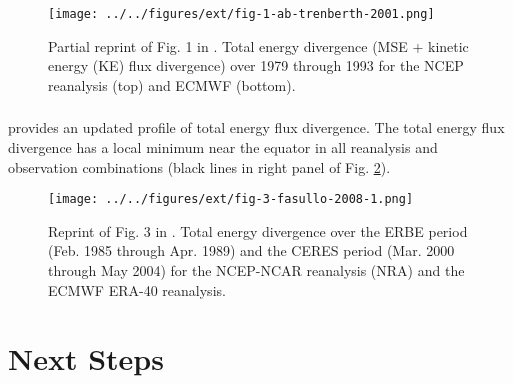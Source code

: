 \documentclass[11pt]{article}
\begin{document}
\begin{figure}[htbp]
\centering
\texttt{[image: ../../figures/ext/fig-1-ab-trenberth-2001.png]}
\caption{\label{fig:org11c0aa0}Partial reprint of Fig. 1 in \cite{trenberth_atmospheric_2001}. Total energy divergence (MSE + kinetic energy (KE) flux divergence) over 1979 through 1993 for the NCEP reanalysis (top) and ECMWF (bottom).}
\end{figure}

\subsubsection{\cite{fasullo_annual_2008-1}}
\label{sec:orge1b7cb9}
\cite{fasullo_annual_2008-1} provides an updated profile of total energy flux divergence. The total energy flux divergence has a local minimum near the equator in all reanalysis and observation combinations (black lines in right panel of Fig. \ref{fig:orgb8d6b32}).

\begin{figure}[htbp]
\centering
\texttt{[image: ../../figures/ext/fig-3-fasullo-2008-1.png]}
\caption{\label{fig:orgb8d6b32}Reprint of Fig. 3 in \cite{fasullo_annual_2008-1}. Total energy divergence over the ERBE period (Feb. 1985 through Apr. 1989) and the CERES period (Mar. 2000 through May 2004) for the NCEP-NCAR reanalysis (NRA) and the ECMWF ERA-40 reanalysis.}
\end{figure}

\section{Next Steps}
\label{sec:org030ace5}



\end{document}
